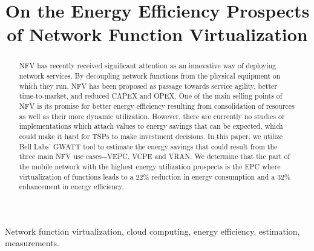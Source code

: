 \documentclass[conference]{IEEEtran}
\begin{document}
\title{On the Energy Efficiency Prospects of Network Function Virtualization}

\author{
}

\maketitle

\begin{abstract}
\ac{NFV} has recently received significant attention as an innovative way of deploying network services. By decoupling network functions from the physical equipment on which they run, \ac{NFV} has been proposed as passage towards service agility, better time-to-market, and reduced \ac{CAPEX} and \ac{OPEX}. One of the main selling points of \ac{NFV} is its promise for better energy efficiency resulting from consolidation of resources as well as their more dynamic utilization. However, there are currently no studies or implementations which attach values to energy savings that can be expected, which could make it hard for \acp{TSP} to make investment decisions. In this paper, we utilize Bell Labs' GWATT tool to estimate the energy savings that could result from the three main NFV use cases$-$\ac{VEPC}, \ac{VCPE} and \ac{VRAN}. We determine that the part of the mobile network with the highest energy utilization prospects is the \ac{EPC} where virtualization of functions leads to a 22\% reduction in energy consumption and a 32\% enhancement in energy efficiency.
\end{abstract}

\begin{IEEEkeywords}
Network function virtualization, cloud computing, energy efficiency, estimation, measurements.
\end{IEEEkeywords}
\end{document}
